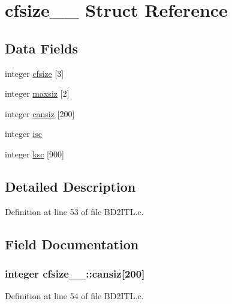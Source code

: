 \hypertarget{structcfsize__1__}{}\section{cfsize\+\_\+\_\+ Struct Reference}
\label{structcfsize__1__}
\subsection*{Data Fields}
\begin{DoxyCompactItemize}
\item 
integer \hyperlink{structcfsize__1___a0b7546b13614f0ab18107b0cf24dc019}{cfsize} \mbox{[}3\mbox{]}
\item 
integer \hyperlink{structcfsize__1___ad1842b6e18dee23a07d08eb05080b972}{maxsiz} \mbox{[}2\mbox{]}
\item 
integer \hyperlink{structcfsize__1___a7abdf4f75ea8f7d63bffb67f57b0e7ac}{cansiz} \mbox{[}200\mbox{]}
\item 
integer \hyperlink{structcfsize__1___a4b539fb62bf158151557e116f4324ac2}{isc}
\item 
integer \hyperlink{structcfsize__1___a2d4ff4bdc178e1b20b87e419f562eb8a}{ksc} \mbox{[}900\mbox{]}
\end{DoxyCompactItemize}


\subsection{Detailed Description}


Definition at line 53 of file B\+D2\+I\+T\+L.\+c.



\subsection{Field Documentation}
\subsubsection[{\texorpdfstring{cansiz}{cansiz}}]{\setlength{\rightskip}{0pt plus 5cm}integer cfsize\+\_\+\_\+\+::cansiz\mbox{[}200\mbox{]}}\hypertarget{structcfsize__1___a7abdf4f75ea8f7d63bffb67f57b0e7ac}{}\label{structcfsize__1___a7abdf4f75ea8f7d63bffb67f57b0e7ac}


Definition at line 54 of file B\+D2\+I\+T\+L.\+c.


